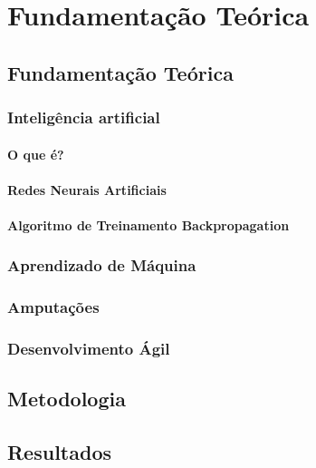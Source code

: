 \part{Fundamentação Teórica}
\chapter[Fundamentação Teórica]{Fundamentação Teórica}

\section{Inteligência artificial}
    \subsection{O que é?}
        
    \subsection{Redes Neurais Artificiais}
        
    \subsection{Algoritmo de Treinamento Backpropagation}
        

\section{Aprendizado de Máquina}
    

\section{Amputações}
    

\section{Desenvolvimento Ágil}
    

\chapter[Metodologia]{Metodologia}
    

\chapter{Resultados}
    